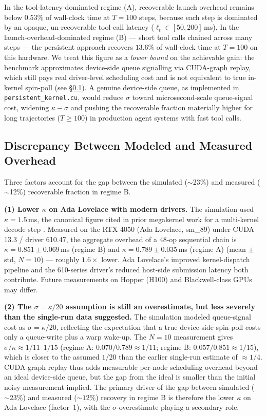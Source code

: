 \documentclass{article}
\begin{document}
In the tool-latency-dominated regime (A), recoverable launch overhead
remains below $0.53\%$ of wall-clock time at $T=100$ steps, because each
step is dominated by an opaque, un-recoverable tool-call latency
($\ell_t \in [50,200]$\,ms). In the launch-overhead-dominated regime (B)
--- short tool calls chained across many steps --- the persistent approach
recovers $\mathbf{13.6\%}$ of wall-clock time at $T=100$ on this hardware.
We treat this figure as a \emph{lower bound} on the achievable gain: the
benchmark approximates device-side queue signalling via CUDA-graph replay,
which still pays real driver-level scheduling cost and is not equivalent
to true in-kernel spin-poll (see \S\ref{sec:discrepancy}). A genuine
device-side queue, as implemented in \texttt{persistent\_kernel.cu}, would
reduce $\sigma$ toward microsecond-scale queue-signal cost, widening
$\kappa - \sigma$ and pushing the recoverable fraction materially higher
for long trajectories ($T \geq 100$) in production agent systems with
fast tool calls.

\subsection{Discrepancy Between Modeled and Measured Overhead}
\label{sec:discrepancy}

Three factors account for the gap between the simulated ($\sim$23\%)
and measured ($\sim$12\%) recoverable fraction in regime B.

\textbf{(1) Lower $\kappa$ on Ada Lovelace with modern drivers.}
The simulation used $\kappa = 1.5$\,ms, the canonical figure cited in
prior megakernel work for a multi-kernel decode step
\citep{mpk2025,adamk2026}. Measured on the RTX 4050 (Ada Lovelace,
sm\_89) under CUDA 13.3 / driver 610.47, the aggregate overhead of a
48-op sequential chain is $\kappa = 0.851\pm0.069$\,ms (regime B) and
$\kappa = 0.789\pm0.035$\,ms (regime A) (mean $\pm$ std, $N=10$) ---
roughly $1.6\times$ lower.
Ada Lovelace's improved kernel-dispatch pipeline and the 610-series
driver's reduced host-side submission latency both contribute. Future
measurements on Hopper (H100) and Blackwell-class GPUs may differ.

\textbf{(2) The $\sigma = \kappa/20$ assumption is still an overestimate,
but less severely than the single-run data suggested.}
The simulation modeled queue-signal cost as $\sigma = \kappa/20$,
reflecting the expectation that a true device-side spin-poll costs
only a queue-write plus a warp wake-up. The $N=10$ measurement gives
$\sigma/\kappa \approx 1/11$--$1/15$ (regime A: $0.070/0.789 \approx
1/11$; regime B: $0.057/0.851 \approx 1/15$), which is closer to the
assumed $1/20$ than the earlier single-run estimate of $\approx 1/4$.
CUDA-graph replay thus adds measurable per-node scheduling overhead
beyond an ideal device-side queue, but the gap from the ideal is
smaller than the initial noisy measurement implied. The primary
driver of the gap between simulated ($\sim23\%$) and measured
($\sim12\%$) recovery in regime B is therefore the lower $\kappa$ on
Ada Lovelace (factor~1), with the $\sigma$-overestimate playing a
secondary role.
\end{document}
